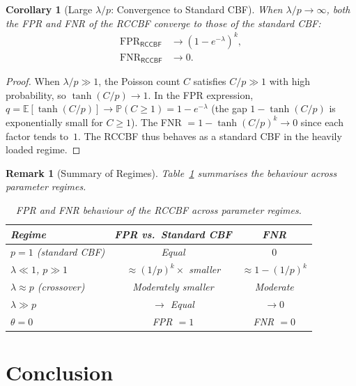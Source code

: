 \documentclass[11pt,a4paper]{article}
\newtheorem{corollary}[theorem]{Corollary}
\newtheorem{remark}[theorem]{Remark}
\newcommand{\RCCBF}{\textsf{RCCBF}}
\newcommand{\FPR}{\mathrm{FPR}}
\newcommand{\FNR}{\mathrm{FNR}}
\newcommand{\E}{\mathbb{E}}
\newcommand{\Prob}{\mathbb{P}}
\begin{document}
\begin{corollary}[Large $\lambda/p$: Convergence to Standard
CBF]\label{cor:large-load}
When $\lambda / p \to \infty$, both the FPR and FNR of the \RCCBF{}
converge to those of the standard CBF:
\begin{align}
  \FPR_{\RCCBF} &\to (1 - e^{-\lambda})^k, \label{eq:fpr-converge} \\
  \FNR_{\RCCBF} &\to 0. \label{eq:fnr-converge}
\end{align}
\end{corollary}

\begin{proof}
When $\lambda / p \gg 1$, the Poisson count $C$ satisfies $C/p \gg 1$
with high probability, so $\tanh(C/p) \to 1$.  In the FPR expression,
$q = \E[\tanh(C/p)] \to \Prob(C \ge 1) = 1 - e^{-\lambda}$ (the gap
$1 - \tanh(C/p)$ is exponentially small for $C \ge 1$).  The FNR
$= 1 - \tanh(C/p)^k \to 0$ since each factor tends to~$1$.
The \RCCBF{} thus behaves as a standard CBF in the heavily loaded
regime.
\end{proof}

\begin{remark}[Summary of Regimes]\label{rem:regimes}
Table~\ref{tab:regimes} summarises the behaviour across parameter regimes.

\begin{table}[h]
\centering
\begin{tabular}{lcc}
\hline
\textbf{Regime} & \textbf{FPR vs.\ Standard CBF} & \textbf{FNR} \\
\hline
$p = 1$ (standard CBF) & Equal & $0$ \\
$\lambda \ll 1$, $p \gg 1$ & $\approx (1/p)^k \times$ smaller
  & $\approx 1 - (1/p)^k$ \\
$\lambda \approx p$ (crossover) & Moderately smaller & Moderate \\
$\lambda \gg p$ & $\to$ Equal & $\to 0$ \\
$\theta = 0$ & FPR $= 1$ & FNR $= 0$ \\
\hline
\end{tabular}
\caption{FPR and FNR behaviour of the \RCCBF{} across parameter regimes.}
\label{tab:regimes}
\end{table}
\end{remark}

\section{Conclusion}\label{sec:conclusion}
\end{document}
